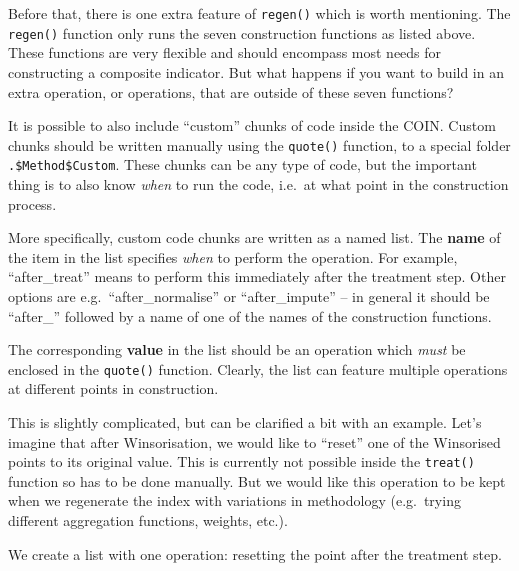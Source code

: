 \documentclass[
]{book}
\begin{document}
Before that, there is one extra feature of \texttt{regen()} which is worth mentioning. The \texttt{regen()} function only runs the seven construction functions as listed above. These functions are very flexible and should encompass most needs for constructing a composite indicator. But what happens if you want to build in an extra operation, or operations, that are outside of these seven functions?

It is possible to also include ``custom'' chunks of code inside the COIN. Custom chunks should be written manually using the \texttt{quote()} function, to a special folder \texttt{.\$Method\$Custom}. These chunks can be any type of code, but the important thing is to also know \emph{when} to run the code, i.e.~at what point in the construction process.

More specifically, custom code chunks are written as a named list. The \textbf{name} of the item in the list specifies \emph{when} to perform the operation. For example, ``after\_treat'' means to perform this immediately after the treatment step. Other options are e.g.~``after\_normalise'' or ``after\_impute'' -- in general it should be ``after\_'' followed by a name of one of the names of the construction functions.

The corresponding \textbf{value} in the list should be an operation which \emph{must} be enclosed in the \texttt{quote()} function. Clearly, the list can feature multiple operations at different points in construction.

This is slightly complicated, but can be clarified a bit with an example. Let's imagine that after Winsorisation, we would like to ``reset'' one of the Winsorised points to its original value. This is currently not possible inside the \texttt{treat()} function so has to be done manually. But we would like this operation to be kept when we regenerate the index with variations in methodology (e.g.~trying different aggregation functions, weights, etc.).

We create a list with one operation: resetting the point after the treatment step.
\end{document}
